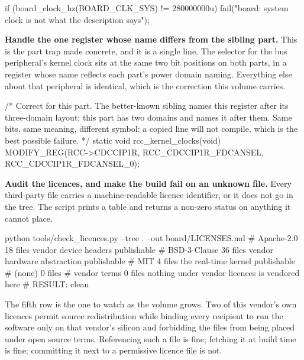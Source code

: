 \begin{steps}
\begin{ccode}
{    if (board_clock_hz(BOARD_CLK_SYS) != 280000000u)
        fail("board: system clock is not what the description says");
}
\end{ccode}

\item \textbf{Handle the one register whose name differs from the sibling
part.} This is the part trap made concrete, and it is a single line. The
selector for the bus peripheral's kernel clock sits at the same two bit
positions on both parts, in a register whose name reflects each part's power
domain naming. Everything else about that peripheral is identical, which is the
correction this volume carries.
\begin{ccode}
/* Correct for this part. The better-known sibling names this register after
   its three-domain layout; this part has two domains and names it after them.
   Same bits, same meaning, different symbol: a copied line will not compile,
   which is the best possible failure. */
static void rcc_kernel_clocks(void)
{
    MODIFY_REG(RCC->CDCCIP1R, RCC_CDCCIP1R_FDCANSEL, RCC_CDCCIP1R_FDCANSEL_0);
}
\end{ccode}


\item \textbf{Audit the licences, and make the build fail on an unknown file.}
Every third-party file carries a machine-readable licence identifier, or it does
not go in the tree. The script prints a table and returns a non-zero status on
anything it cannot place.
\begin{shellcode}
python tools/check_licences.py --tree . --out board/LICENSES.md
# Apache-2.0     18 files   vendor device headers            publishable
# BSD-3-Clause   36 files   vendor hardware abstraction      publishable
# MIT             4 files   the real-time kernel             publishable
# (none)          0 files
# vendor terms    0 files   nothing under vendor licences is vendored here
# RESULT: clean
\end{shellcode}
The fifth row is the one to watch as the volume grows. Two of this vendor's own
licences permit source redistribution while binding every recipient to run the
software only on that vendor's silicon and forbidding the files from being
placed under open source terms. Referencing such a file is fine; fetching it at
build time is fine; committing it next to a permissive licence file is not.


\end{steps}
